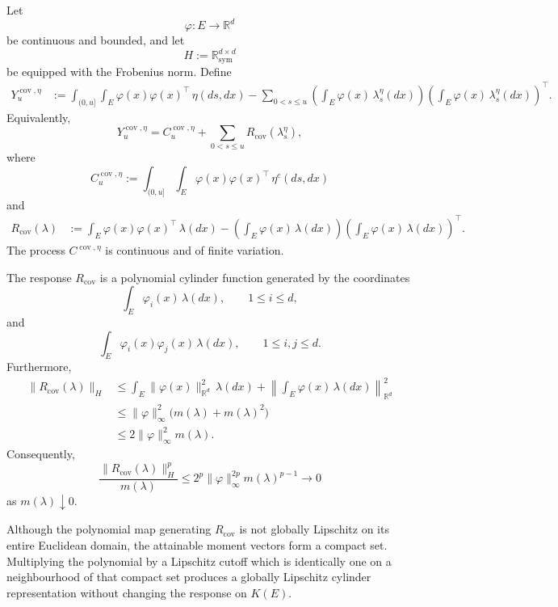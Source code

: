 \documentclass[a4paper,10pt]{article}
\begin{document}
Let
\[
        \varphi:E\longrightarrow\mathbb R^d
\]
be continuous and bounded, and let
\[
        H:=\mathbb R_{\mathrm{sym}}^{d\times d}
\]
be equipped with the Frobenius norm. Define
\[
\begin{aligned}
Y_u^{\operatorname{cov},\eta}
&:=
\int_{(0,u]}\int_E
\varphi(x)\varphi(x)^\top\,\eta(ds,dx)
-
\sum_{0<s\le u}
\left(
        \int_E\varphi(x)\,\lambda_s^\eta(dx)
\right)
\left(
        \int_E\varphi(x)\,\lambda_s^\eta(dx)
\right)^\top.
\end{aligned}
\]
Equivalently,
\[
        Y_u^{\operatorname{cov},\eta}
        =
        C_u^{\operatorname{cov},\eta}
        +
        \sum_{0<s\le u}
        R_{\operatorname{cov}}(\lambda_s^\eta),
\]
where
\[
        C_u^{\operatorname{cov},\eta}
        :=
        \int_{(0,u]}\int_E
        \varphi(x)\varphi(x)^\top\,\eta^c(ds,dx)
\]
and
\[
\begin{aligned}
R_{\operatorname{cov}}(\lambda)
&:=
\int_E
\varphi(x)\varphi(x)^\top\,\lambda(dx)
-
\left(
        \int_E\varphi(x)\,\lambda(dx)
\right)
\left(
        \int_E\varphi(x)\,\lambda(dx)
\right)^\top.
\end{aligned}
\]
The process \(C^{\operatorname{cov},\eta}\) is continuous and of finite
variation.

The response \(R_{\operatorname{cov}}\) is a polynomial cylinder
function generated by the coordinates
\[
        \int_E\varphi_i(x)\,\lambda(dx),
        \qquad
        1\le i\le d,
\]
and
\[
        \int_E\varphi_i(x)\varphi_j(x)\,\lambda(dx),
        \qquad
        1\le i,j\le d.
\]
Furthermore,
\[
\begin{aligned}
\lVert R_{\operatorname{cov}}(\lambda)\rVert_H
&\le
\int_E
\lVert\varphi(x)\rVert_{\mathbb R^d}^2\,\lambda(dx)
+
\left\lVert
\int_E\varphi(x)\,\lambda(dx)
\right\rVert_{\mathbb R^d}^2
\\
&\le
\lVert\varphi\rVert_\infty^2
\bigl(m(\lambda)+m(\lambda)^2\bigr)
\\
&\le
2\lVert\varphi\rVert_\infty^2m(\lambda).
\end{aligned}
\]
Consequently,
\[
\frac{
\lVert R_{\operatorname{cov}}(\lambda)\rVert_H^p
}{
m(\lambda)
}
\le
2^p\lVert\varphi\rVert_\infty^{2p}
m(\lambda)^{p-1}
\longrightarrow0
\]
as \(m(\lambda)\downarrow0\).

Although the polynomial map generating
\(R_{\operatorname{cov}}\) is not globally Lipschitz on its entire
Euclidean domain, the attainable moment vectors form a compact set.
Multiplying the polynomial by a Lipschitz cutoff which is identically
one on a neighbourhood of that compact set produces a globally
Lipschitz cylinder representation without changing the response on
\(K(E)\).
\end{document}
